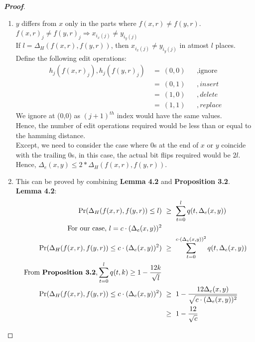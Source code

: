 \documentclass{article}
\begin{document}
\begin{proof}[\textbf{Proof}]
\begin{enumerate}
        \item $y$ differs from $x$ only in the parts where $f(x,r)\neq f(y,r)$.\\
        $f(x,r)_j\neq f(y,r)_j \Longrightarrow x_{i_x(j)}\neq y_{i_y(j)}$\\
        If $l=\Delta_H(f(x,r),f(y,r))$, then $x_{i_x(j)}\neq y_{i_y(j)}$ in atmost
        $l$ places.\\
        Define the following edit operations:\\
        \begin{align*}
            h_j(f(x,r)_j),h_j(f(y,r)_j) &~=~ (0,0) &&, \text{ignore} \nonumber\\
            &~=~ (0,1) &&,insert \nonumber \\
            &~=~ (1,0) &&,delete \nonumber \\
            &~=~ (1,1) &&,replace \nonumber
        \end{align*}
        We ignore at (0,0) as $(j+1)^{th}$ index would have the same values.\\
        Hence, the number of edit operations required would be less than or equal to the 
        hamming distance. \\
        Except, we need to consider the case where $0$s at the end of $x$ or $y$ 
        coincide with the trailing $0$s, in this case, the actual bit flips required
        would be $2l$.\\
        Hence, $\Delta_e(x,y) \leq 2*\Delta_H(f(x,r),f(y,r))$.\\


        \item This can be proved by combining \textbf{Lemma 4.2} and 
        \textbf{Proposition 3.2}.\\
        \textbf{Lemma 4.2}: 
        \begin{align}
            \Pr(\Delta_H(f(x,r),f(y,r))\leq l) &~\geq~ 
            \sum_{t=0}^{l} q(t,\Delta_e(x,y))\nonumber\\
            \text{For our case, $l=c\cdot (\Delta_e(x,y))^2$} \nonumber\\
            \Pr(\Delta_H(f(x,r),f(y,r))\leq c\cdot (\Delta_e(x,y))^2) &~\geq~ 
            \sum_{t=0}^{c\cdot (\Delta_e(x,y))^2} q(t,\Delta_e(x,y)) \nonumber\\
            \text{From \textbf{Proposition 3.2},} 
            \sum_{t=0}^{l} q(t,k) \geq 1- \frac{12k}{\sqrt{l}} \nonumber \\
            \Pr(\Delta_H(f(x,r),f(y,r))\leq c\cdot (\Delta_e(x,y))^2) &~\geq~ 
            1-\frac{12\Delta_e(x,y)}{\sqrt{c\cdot (\Delta_e(x,y))^2}}  \nonumber \\
            &~\geq~ 1-\frac{12}{\sqrt{c}} \nonumber
        \end{align}
    \end{enumerate}
\end{proof}
\end{document}
